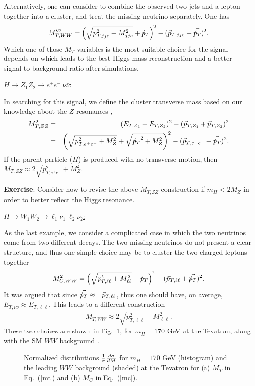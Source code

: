 \documentclass[12pt,prd,aps,floats,preprintnumbers,preprint,superscriptaddress,floatfix,nofootinbib]{revtex4}
\newcommand{ \slashchar }[1]{\setbox0=\hbox{$#1$}   %
   \dimen0=\wd0                                     %
   \setbox1=\hbox{/} \dimen1=\wd1                   %
   \ifdim\dimen0>\dimen1                            %
      \rlap{\hbox to \dimen0{\hfil/\hfil}}          %
      #1                                            %
   \else                                            %
      \rlap{\hbox to \dimen1{\hfil$#1$\hfil}}       %
      /                                             %
   \fi}                                             %
\def\ptmiss{\slashchar{p}_{T}}
\def\epem{e^+e^-}
\def\bea{\begin{eqnarray}}
\def\eea{\end{eqnarray}}
\begin{document}
Alternatively, one can consider to combine the observed two jets and a lepton 
together into a cluster, and treat the missing neutrino separately. One has 
\bea
 M_{T,WW}^{\prime\prime 2}
= \left(\sqrt{p_{T,jje}^2 + M_{jje}^2} + \ptmiss   \right)^2 
- (\vec p_{T,jje} + \vec{\ptmiss } )^2.
\nonumber
\eea
Which one of those $M_T$ variables is the most suitable choice for the signal
depends on which leads to the best Higgs mass reconstruction and a better
signal-to-background ratio after simulations.

\vskip 0.2cm
\noindent
\underline{$H\to Z_1 Z_2 \to \epem\ \nu\bar\nu$:}

In searching for this signal,  we define the cluster transverse mass based
on our knowledge about the $Z$ resonances  \cite{MTH},
\bea
\nonumber
 M_{T,ZZ}^2 &=&  (E_{T,Z_1} + E_{T,Z_2} )^2 - (\vec p_{T,Z_1} + \vec p_{T,Z_2} )^2 \\
&=& \left(\sqrt{p_{T,\epem}^2 + M_Z^2} + \sqrt{ {\ptmiss}^2 + M_Z^2}  \right)^2 
- (\vec p_{T,\epem} + \vec{\ptmiss } )^2.
\nonumber
\eea
If the parent particle ($H$) is produced with no transverse motion, then
$M_{T,ZZ} \approx 2 \sqrt{p_{T,\epem}^2 + M_Z^2}. $

{
\vskip 0.2cm
\noindent
{\bf Exercise}: Consider how to revise the above $M_{T,ZZ}$ construction
if $m_H^{} < 2M_Z$ in order to better reflect the Higgs resonance.
\vskip 0.2cm
}

\vskip 0.2cm
\noindent
\underline{$H\to W_1 W_2 \to \ell_1\nu_1\ \ell_2 \nu_2$:}

As the last example, we consider a complicated case in which the two
neutrinos come from two different decays. The two missing neutrinos
do not present a clear structure, and thus one simple choice may be
to cluster the two charged leptons together  \cite{CMT}
\bea
 M_{C,WW}^{2}
= \left(\sqrt{p_{T,\ell\ell}^2 + M_{\ell\ell}^2} + \ptmiss   \right)^2 
- (\vec p_{T,\ell\ell} + \vec{\ptmiss } )^2.
\label{mc}
\eea
It was argued that since $\vec{\ptmiss} \approx - \vec p_{T,\ell\ell}$,
thus one should have, on average, $E_{T,\nu\nu} \approx E_{T, \ell\ell}$. 
This leads to a different construction \cite{Herbi}
\bea
 M_{T,WW}^{} \approx 2 \sqrt{p_{T,\ell\ell}^2 + M_{\ell\ell}^2}.
\label{mt}
\eea
These two choices are shown in Fig.~\ref{MTtc}, for $m_H^{}=170$ GeV
at the Tevatron, along with the SM $WW$ background \cite{HanZhang}.

\begin{center}
\begin{figure}[tb]
\vskip -1cm
\caption{ Normalized distributions 
${1\over \sigma} {d\sigma\over d M}$ for  $m_H^{}=170$ GeV (histogram)
and the leading $WW$ background (shaded) at the Tevatron for (a) $M_T$ 
in Eq.~(\ref{mt}) and (b) $M_C$ in Eq.~(\ref{mc}).}
\label{MTtc}
\end{figure}
\end{center}
 
\end{document}

